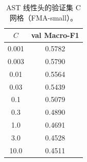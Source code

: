 \begin{table}[H]
\centering\small
\caption{AST 线性头的验证集 C 网格（FMA-small）。}
\label{tab:ast-grid}
\begin{tabular}{cc}
\toprule
$C$ & val Macro-F1\\
\midrule
0.001 & 0.5782\\
0.003 & 0.5790\\
0.01 & 0.5564\\
0.03 & 0.5439\\
0.1 & 0.5079\\
0.3 & 0.4890\\
1.0 & 0.4691\\
3.0 & 0.4528\\
10.0 & 0.4511\\
\bottomrule
\end{tabular}
\end{table}
